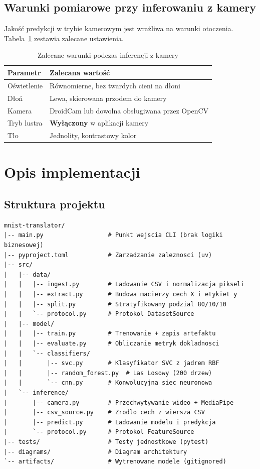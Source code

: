 \subsection{Warunki pomiarowe przy inferowaniu z kamery}

Jakość predykcji w trybie kamerowym jest wrażliwa na warunki otoczenia.
Tabela~\ref{tab:warunki} zestawia zalecane ustawienia.

\begin{table}[H]
    \centering
    \caption{Zalecane warunki podczas inferencji z kamery}
    \label{tab:warunki}
    \begin{tabular}{ll}
        \toprule
        \textbf{Parametr} & \textbf{Zalecana wartość} \\
        \midrule
        Oświetlenie   & Równomierne, bez twardych cieni na dłoni \\
        Dłoń          & Lewa, skierowana przodem do kamery \\
        Kamera        & DroidCam lub dowolna obsługiwana przez OpenCV \\
        Tryb lustra   & \textbf{Wyłączony} w aplikacji kamery \\
        Tło           & Jednolity, kontrastowy kolor \\
        \bottomrule
    \end{tabular}
\end{table}

\section{Opis implementacji}

\subsection{Struktura projektu}

\begin{lstlisting}[style=styleBash, caption={Struktura katalogów projektu mnist-translator}, label=lst:struktura, numbers=none]
mnist-translator/
|-- main.py                  # Punkt wejscia CLI (brak logiki biznesowej)
|-- pyproject.toml           # Zarzadzanie zaleznosci (uv)
|-- src/
|   |-- data/
|   |   |-- ingest.py        # Ladowanie CSV i normalizacja pikseli
|   |   |-- extract.py       # Budowa macierzy cech X i etykiet y
|   |   |-- split.py         # Stratyfikowany podzial 80/10/10
|   |   `-- protocol.py      # Protokol DatasetSource
|   |-- model/
|   |   |-- train.py         # Trenowanie + zapis artefaktu
|   |   |-- evaluate.py      # Obliczanie metryk dokladnosci
|   |   `-- classifiers/
|   |       |-- svc.py       # Klasyfikator SVC z jadrem RBF
|   |       |-- random_forest.py  # Las Losowy (200 drzew)
|   |       `-- cnn.py       # Konwolucyjna siec neuronowa
|   `-- inference/
|       |-- camera.py        # Przechwytywanie wideo + MediaPipe
|       |-- csv_source.py    # Zrodlo cech z wiersza CSV
|       |-- predict.py       # Ladowanie modelu i predykcja
|       `-- protocol.py      # Protokol FeatureSource
|-- tests/                   # Testy jednostkowe (pytest)
|-- diagrams/                # Diagram architektury
`-- artifacts/               # Wytrenowane modele (gitignored)
\end{lstlisting}

